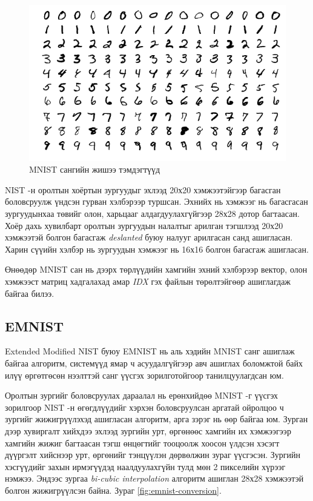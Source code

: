 \begin{figure}[ht]
	\centering
	\includegraphics[width=0.9\linewidth]{images/mnist}
	\caption{MNIST сангийн жишээ тэмдэгтүүд \cite{mnist}}
	\label{fig:mnist-sample}
\end{figure}

NIST -н оролтын хоёртын зургуудыг эхлээд 20х20 хэмжээтэйгээр багасган боловсруулж үндсэн гурван хэлбэрээр туршсан. Эхнийх нь хэмжээг нь багасгасан зургуудынхаа төвийг олон, харьцааг алдагдуулахгүйгээр 28х28 дотор багтаасан. Хоёр дахь хувилбарт оролтын зургуудын налалтыг арилган тэгшлээд 20х20 хэмжээтэй болгон багасгаж \textit{deslanted} буюу налууг арилгасан санд ашигласан. Харин сүүийн хэлбэр нь зургуудын хэмжээг нь 16х16 болгон багасгаж ашигласан.

Өнөөдөр MNIST сан нь дээрх төрлүүдийн хамгийн эхний хэлбэрээр вектор, олон хэмжээст матриц хадгалахад амар \textit{IDX} гэх файлын төрөлтэйгөөр ашиглагдаж байгаа билээ.

\subsection{EMNIST \cite{emnist}}

Extended Modified NIST буюу EMNIST нь аль хэдийн MNIST санг ашиглаж байгаа алгоритм, системүүд ямар ч асуудалгүйгээр авч ашиглах боломжтой байх илүү өргөтгөсөн нээлттэй санг үүсгэх зорилготойгоор танилцуулагдсан юм.

Оролтын зургийг боловсруулах дараалал нь ерөнхийдөө MNIST\cite{mnist} -г үүсгэх зорилгоор NIST\cite{nist19} -н өгөгдлүүдийг хэрхэн боловсруулсан аргатай ойролцоо ч зургийг жижигрүүлэхэд ашигласан алгоритм, арга зэрэг нь өөр байгаа юм. Зурган дээр хувиргалт хийхдээ эхлээд зургийн урт, өргөнөөс хамгийн их хэмжээгээр хамгийн жижиг багтаасан тэгш өнцөгтийг тооцоолж хоосон үлдсэн хэсэгт дүүргэлт хийснээр урт, өргөнийг тэнцүүлэн дөрвөлжин зураг үүсгэсэн. Зургийн хэсгүүдийг захын ирмэгүүдэд наалдуулахгүйн тулд мөн 2 пикселийн хүрээг нэмжээ. Эндээс зургаа \textit{bi-cubic interpolation} алгоритм ашиглан 28х28 хэмжээтэй болгон жижигрүүлсэн байна. Зураг \ref{fig:emnist-conversion}.

